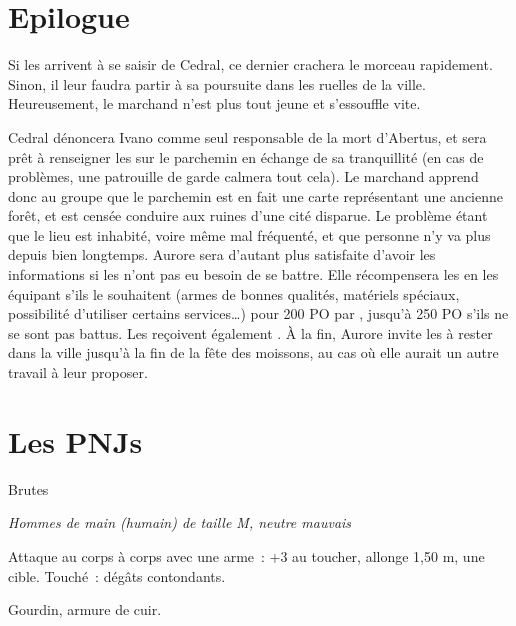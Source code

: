 \documentclass[a4paper,10pt,openany]{book}
\begin{document}
\begin{multicols}{2}
\section{Epilogue}
Si les \PJs arrivent à se saisir de Cedral, ce dernier crachera le morceau rapidement. Sinon, il leur faudra partir à sa poursuite dans les ruelles de
la ville. Heureusement, le marchand n’est plus tout jeune et s’essouffle vite.\par Cedral dénoncera Ivano comme seul responsable de la mort d’Abertus,
et sera prêt à renseigner les \PJs sur le parchemin en échange de sa tranquillité (en cas de problèmes, une patrouille de garde calmera tout cela).
Le marchand apprend donc au groupe que le parchemin est en fait une carte représentant une ancienne forêt, et est censée conduire aux ruines d’une
cité disparue. Le problème étant que le lieu est inhabité, voire même mal fréquenté, et que personne n’y va plus depuis bien longtemps. Aurore sera
d’autant plus satisfaite d’avoir les informations si les \PJs n’ont pas eu besoin de se battre. Elle récompensera les \PJs en les équipant s’ils le
souhaitent (armes de bonnes qualités, matériels spéciaux, possibilité d’utiliser certains services…) pour 200 PO par \PJ, jusqu’à 250 PO s’ils ne se
sont pas battus. Les \PJs reçoivent également .
À la fin, Aurore invite les \PJs à rester dans la ville jusqu’à la fin de la fête des moissons, au cas où elle aurait un autre travail à leur
proposer.

\pagebreak
\section{Les PNJs}

\begin{monsterbox}{Brutes}
	\begin{hangingpar}
		\textit{Hommes de main (humain) de taille M, neutre mauvais}
	\end{hangingpar}
	\dndline%
	\basics[%
	armorclass = 11 (armure de cuir),
	hitpoints  = \dice{2d8+2},
	speed      = 9 m
	]
	\dndline%
	\stats[
	STR = \stat{12},
	CON = \stat{12}
	]
	\dndline%
	\details[%
	senses= Perception passive 10,
	languages = {bas-thrain, vethrain},
	challenge= 1/8
	]
	\dndline%
	\begin{monsteraction}[Gourdin]
		Attaque au corps à corps avec une arme : +3 au toucher, allonge 1,50 m, une cible. Touché :  dégâts contondants.
	\end{monsteraction}
	\dndline%
	\begin{monsteraction}[Possessions]
		Gourdin, armure de cuir.
	\end{monsteraction}
\end{monsterbox}


\end{multicols}
\end{document}
